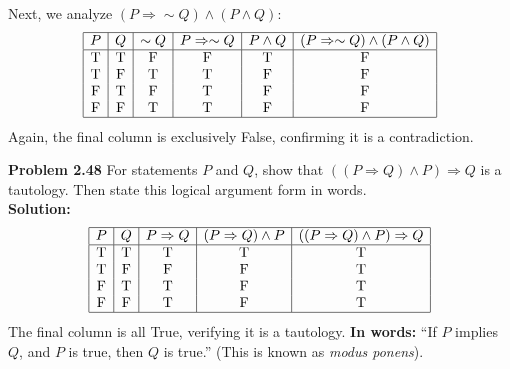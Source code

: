 \documentclass{article}
\begin{document}
Next, we analyze $(P \Rightarrow \sim Q) \land (P \land Q)$:
\[
\begin{array}{|c|c|c|c|c|c|}
\hline
P & Q & \sim Q & P \Rightarrow \sim Q & P \land Q & (P \Rightarrow \sim Q) \land (P \land Q) \\
\hline
\text{T} & \text{T} & \text{F} & \text{F} & \text{T} & \text{F} \\
\text{T} & \text{F} & \text{T} & \text{T} & \text{F} & \text{F} \\
\text{F} & \text{T} & \text{F} & \text{T} & \text{F} & \text{F} \\
\text{F} & \text{F} & \text{T} & \text{T} & \text{F} & \text{F} \\
\hline
\end{array}
\]
Again, the final column is exclusively False, confirming it is a contradiction.

\vspace{1em}
\textbf{Problem 2.48} For statements $P$ and $Q$, show that $((P \Rightarrow Q) \land P) \Rightarrow Q$ is a tautology. Then state this logical argument form in words.
\\[0.5em]
\textbf{Solution:}
\[
\begin{array}{|c|c|c|c|c|}
\hline
P & Q & P \Rightarrow Q & (P \Rightarrow Q) \land P & ((P \Rightarrow Q) \land P) \Rightarrow Q \\
\hline
\text{T} & \text{T} & \text{T} & \text{T} & \text{T} \\
\text{T} & \text{F} & \text{F} & \text{F} & \text{T} \\
\text{F} & \text{T} & \text{T} & \text{F} & \text{T} \\
\text{F} & \text{F} & \text{T} & \text{F} & \text{T} \\
\hline
\end{array}
\]
The final column is all True, verifying it is a tautology.
\textbf{In words:} ``If $P$ implies $Q$, and $P$ is true, then $Q$ is true.'' (This is known as \textit{modus ponens}).
\end{document}
